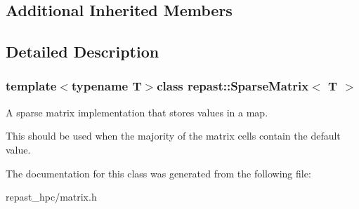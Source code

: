 \subsection*{Additional Inherited Members}


\subsection{Detailed Description}
\subsubsection*{template$<$typename T$>$class repast\-::\-Sparse\-Matrix$<$ T $>$}

A sparse matrix implementation that stores values in a map. 

This should be used when the majority of the matrix cells contain the default value. 

The documentation for this class was generated from the following file\-:\begin{DoxyCompactItemize}
\item 
repast\-\_\-hpc/matrix.\-h\end{DoxyCompactItemize}
